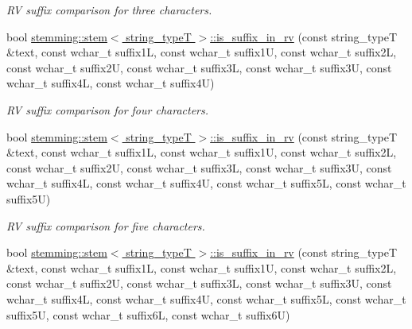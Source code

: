 \begin{DoxyCompactItemize}
\begin{DoxyCompactList}\small\item\em R\-V suffix comparison for three characters. \end{DoxyCompactList}\item 
\hypertarget{group___stemming_gacdaff4e73f7f3841beed04775b5d4f21}{bool \hyperlink{group___stemming_gacdaff4e73f7f3841beed04775b5d4f21}{stemming\-::stem$<$ string\-\_\-type\-T $>$\-::is\-\_\-suffix\-\_\-in\-\_\-rv} (const string\-\_\-type\-T \&text, const wchar\-\_\-t suffix1\-L, const wchar\-\_\-t suffix1\-U, const wchar\-\_\-t suffix2\-L, const wchar\-\_\-t suffix2\-U, const wchar\-\_\-t suffix3\-L, const wchar\-\_\-t suffix3\-U, const wchar\-\_\-t suffix4\-L, const wchar\-\_\-t suffix4\-U)}\label{group___stemming_gacdaff4e73f7f3841beed04775b5d4f21}

\begin{DoxyCompactList}\small\item\em R\-V suffix comparison for four characters. \end{DoxyCompactList}\item 
\hypertarget{group___stemming_ga99ef9b0e80da18c39cc0206a666bd4b1}{bool \hyperlink{group___stemming_ga99ef9b0e80da18c39cc0206a666bd4b1}{stemming\-::stem$<$ string\-\_\-type\-T $>$\-::is\-\_\-suffix\-\_\-in\-\_\-rv} (const string\-\_\-type\-T \&text, const wchar\-\_\-t suffix1\-L, const wchar\-\_\-t suffix1\-U, const wchar\-\_\-t suffix2\-L, const wchar\-\_\-t suffix2\-U, const wchar\-\_\-t suffix3\-L, const wchar\-\_\-t suffix3\-U, const wchar\-\_\-t suffix4\-L, const wchar\-\_\-t suffix4\-U, const wchar\-\_\-t suffix5\-L, const wchar\-\_\-t suffix5\-U)}\label{group___stemming_ga99ef9b0e80da18c39cc0206a666bd4b1}

\begin{DoxyCompactList}\small\item\em R\-V suffix comparison for five characters. \end{DoxyCompactList}\item 
\hypertarget{group___stemming_ga527b081fee02f191713a50dbc396f986}{bool \hyperlink{group___stemming_ga527b081fee02f191713a50dbc396f986}{stemming\-::stem$<$ string\-\_\-type\-T $>$\-::is\-\_\-suffix\-\_\-in\-\_\-rv} (const string\-\_\-type\-T \&text, const wchar\-\_\-t suffix1\-L, const wchar\-\_\-t suffix1\-U, const wchar\-\_\-t suffix2\-L, const wchar\-\_\-t suffix2\-U, const wchar\-\_\-t suffix3\-L, const wchar\-\_\-t suffix3\-U, const wchar\-\_\-t suffix4\-L, const wchar\-\_\-t suffix4\-U, const wchar\-\_\-t suffix5\-L, const wchar\-\_\-t suffix5\-U, const wchar\-\_\-t suffix6\-L, const wchar\-\_\-t suffix6\-U)}\label{group___stemming_ga527b081fee02f191713a50dbc396f986}


\end{DoxyCompactItemize}
